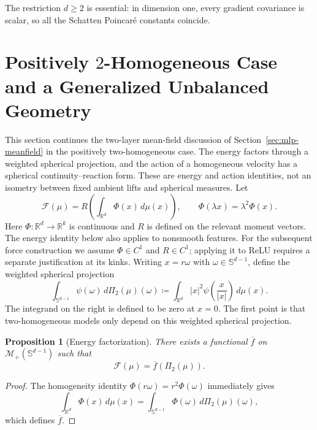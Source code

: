 \documentclass{article}
\newtheorem{proposition}[theorem]{Proposition}
\newcommand{\R}{\mathbb{R}}
\newcommand{\Sd}{\mathbb{S}^{d-1}}
\newcommand{\cM}{\mathcal{M}}
\newcommand{\MF}{\mathcal{F}}
\newcommand{\abs}[1]{\left\lvert #1 \right\rvert}
\begin{document}
The restriction $d\ge2$ is essential: in dimension one, every gradient
covariance is scalar, so all the Schatten Poincar\'e constants coincide.



\section{Positively \texorpdfstring{$2$}{2}-Homogeneous Case and a Generalized Unbalanced Geometry}
\label{app:homogeneous}
This section continues the two-layer mean-field discussion of
Section~\ref{sec:mlp-meanfield} in the positively two-homogeneous case.
The energy factors through a weighted spherical projection, and the action
of a homogeneous velocity has a spherical continuity--reaction form. These
are energy and action identities, not an isometry between fixed ambient
lifts and spherical measures.
Let
$$
\MF(\mu)=R\!\left(\int_{\R^d}\Phi(x)\,d\mu(x)\right),
\qquad
\Phi(\lambda x)=\lambda^2\Phi(x).
$$
Here $\Phi:\R^d\to\R^k$ is continuous and $R$ is defined on the relevant
moment vectors. The energy identity below also applies to nonsmooth features.
For the subsequent force construction we assume $\Phi\in C^1$ and $R\in C^1$;
applying it to ReLU requires a separate justification at its kinks.
Writing $x=r\omega$ with $\omega\in\Sd$, define the weighted spherical projection
$$
\int_{\Sd}\psi(\omega)\,d\Pi_2(\mu)(\omega)
\coloneqq 
\int_{\R^d}\abs{x}^2\psi\!\left(\frac{x}{\abs{x}}\right)\,d\mu(x).
$$
The integrand on the right is defined to be zero at $x=0$.
The first point is that two-homogeneous models only depend on this weighted spherical projection.
\begin{proposition}[Energy factorization]
\label{prop:quotient}
There exists a functional $\overline f$ on $\cM_+(\Sd)$ such that
$$
\MF(\mu)=\overline f(\Pi_2(\mu)).
$$
\end{proposition}

\begin{proof}
The homogeneity identity $\Phi(r\omega)=r^2\Phi(\omega)$ immediately gives
$$
\int_{\R^d}\Phi(x)\,d\mu(x)
=
\int_{\Sd}\Phi(\omega)\,d\Pi_2(\mu)(\omega),
$$
which defines $\overline f$.
\end{proof}
\end{document}
